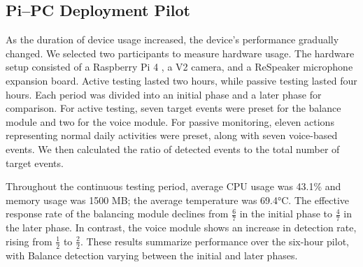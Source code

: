 \documentclass[conference]{IEEEtran}
\providecommand{\revisioncolor}{black}
\DeclareRobustCommand{\revised}[1]{{\color{\revisioncolor}#1}}
\begin{document}








\subsection{Pi--PC Deployment Pilot}
\label{sec:pipc_pilot}

As the duration of device usage increased, the device's performance gradually changed. We selected two participants to measure hardware usage. The hardware setup consisted of a Raspberry Pi 4 , a V2 camera, and a ReSpeaker microphone expansion board. Active testing lasted two hours, while passive testing lasted four hours. Each period was divided into an initial phase and a later phase for comparison. For active testing, seven target events were preset for the balance module and two for the voice module. For passive monitoring, eleven actions representing normal daily activities were preset, along with seven voice-based events. We then calculated the ratio of detected events to the total number of target events.

Throughout the continuous testing period, average CPU usage was 43.1\% and memory usage was 1500 MB; the average temperature was 69.4°C. The effective response rate of the balancing module declines from $\frac{6}{7}$ in the initial phase to $\frac{4}{7}$ in the later phase. In contrast, the voice module shows an increase in detection rate, rising from $\frac{1}{2}$ to $\frac{2}{2}$. \revised{These results summarize performance over the six-hour pilot, with Balance detection varying between the initial and later phases.}

\end{document}
